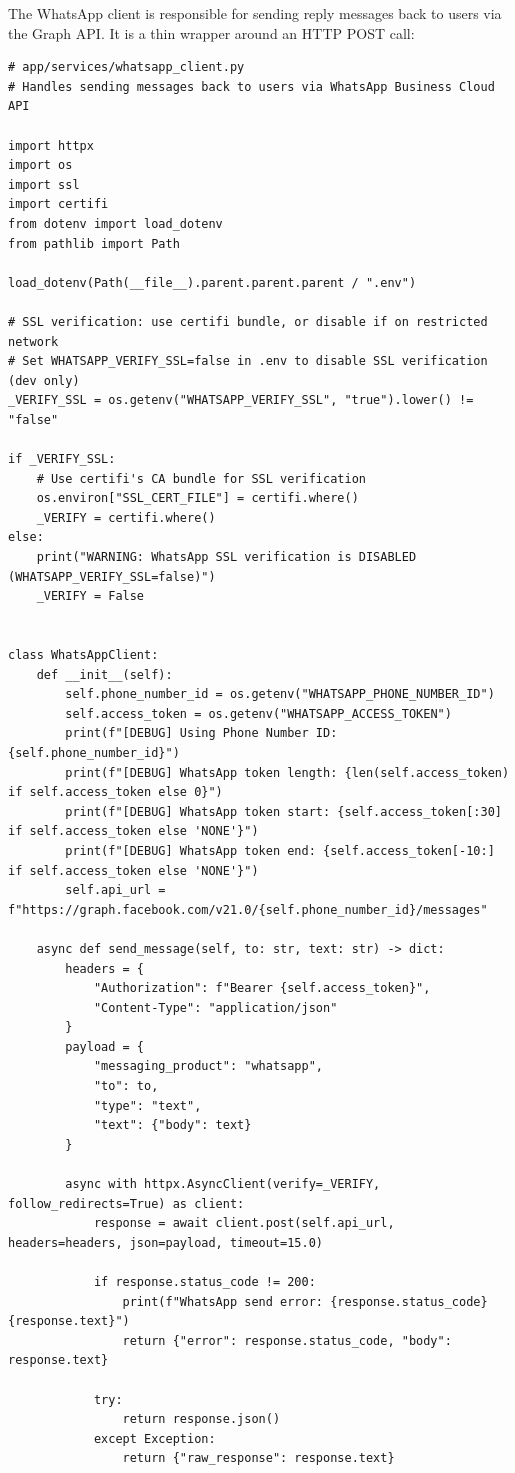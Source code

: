 \documentclass[12pt, a4paper]{report}
\begin{document}
The WhatsApp client is responsible for sending reply messages back to users via the Graph API. It is a thin wrapper around an HTTP POST call:

\begin{lstlisting}[style=pythonstyle, caption={WhatsApp Client --- Full Implementation}]
# app/services/whatsapp_client.py
# Handles sending messages back to users via WhatsApp Business Cloud API

import httpx
import os
import ssl
import certifi
from dotenv import load_dotenv
from pathlib import Path

load_dotenv(Path(__file__).parent.parent.parent / ".env")

# SSL verification: use certifi bundle, or disable if on restricted network
# Set WHATSAPP_VERIFY_SSL=false in .env to disable SSL verification (dev only)
_VERIFY_SSL = os.getenv("WHATSAPP_VERIFY_SSL", "true").lower() != "false"

if _VERIFY_SSL:
    # Use certifi's CA bundle for SSL verification
    os.environ["SSL_CERT_FILE"] = certifi.where()
    _VERIFY = certifi.where()
else:
    print("WARNING: WhatsApp SSL verification is DISABLED (WHATSAPP_VERIFY_SSL=false)")
    _VERIFY = False


class WhatsAppClient:
    def __init__(self):
        self.phone_number_id = os.getenv("WHATSAPP_PHONE_NUMBER_ID")
        self.access_token = os.getenv("WHATSAPP_ACCESS_TOKEN")
        print(f"[DEBUG] Using Phone Number ID: {self.phone_number_id}")
        print(f"[DEBUG] WhatsApp token length: {len(self.access_token) if self.access_token else 0}")
        print(f"[DEBUG] WhatsApp token start: {self.access_token[:30] if self.access_token else 'NONE'}")
        print(f"[DEBUG] WhatsApp token end: {self.access_token[-10:] if self.access_token else 'NONE'}")
        self.api_url = f"https://graph.facebook.com/v21.0/{self.phone_number_id}/messages"

    async def send_message(self, to: str, text: str) -> dict:
        headers = {
            "Authorization": f"Bearer {self.access_token}",
            "Content-Type": "application/json"
        }
        payload = {
            "messaging_product": "whatsapp",
            "to": to,
            "type": "text",
            "text": {"body": text}
        }

        async with httpx.AsyncClient(verify=_VERIFY, follow_redirects=True) as client:
            response = await client.post(self.api_url, headers=headers, json=payload, timeout=15.0)

            if response.status_code != 200:
                print(f"WhatsApp send error: {response.status_code} {response.text}")
                return {"error": response.status_code, "body": response.text}

            try:
                return response.json()
            except Exception:
                return {"raw_response": response.text}
\end{lstlisting}
\end{document}
